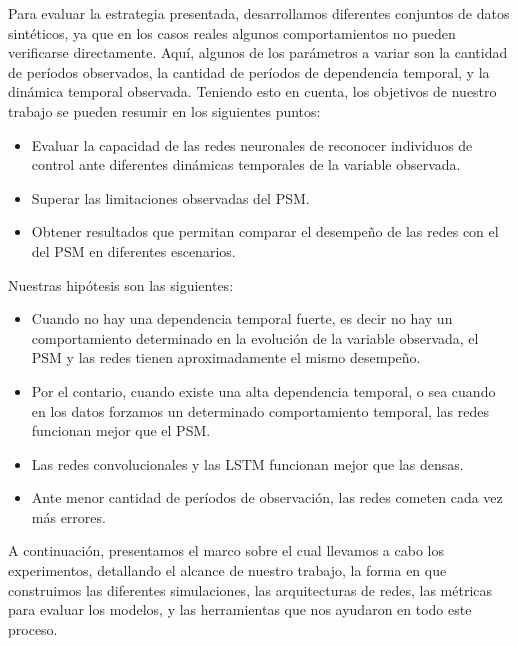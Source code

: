 \documentclass[../main.tex]{subfiles}
\begin{document}
Para evaluar la estrategia presentada, desarrollamos diferentes conjuntos de datos
sintéticos, ya que en los casos reales algunos comportamientos no pueden verificarse
directamente. Aquí, algunos de los parámetros a variar son la cantidad de períodos
observados, la cantidad de períodos de dependencia temporal, y la dinámica temporal
observada. Teniendo esto en cuenta, los objetivos de nuestro trabajo se pueden
resumir en los siguientes puntos:
\begin{itemize}
    \item Evaluar la capacidad de las redes neuronales de reconocer individuos de control
    ante diferentes dinámicas temporales de la variable observada.
    \item Superar las limitaciones observadas del PSM.
    \item Obtener resultados que permitan comparar el desempeño de las redes con
    el del PSM en diferentes escenarios.
\end{itemize}

Nuestras hipótesis son las siguientes:
\begin{itemize}
    \item Cuando no hay una dependencia temporal fuerte, es decir no hay un comportamiento
    determinado en la evolución de la variable observada, el PSM y las redes tienen
    aproximadamente  el mismo desempeño.
    \item Por el contario, cuando existe una alta dependencia temporal, o sea cuando en
    los datos forzamos un determinado comportamiento temporal, las redes funcionan mejor
    que el PSM.
    \item Las redes convolucionales y las LSTM funcionan mejor que las densas.
    \item Ante menor cantidad de períodos de observación, las redes cometen cada
    vez más errores.
\end{itemize}

A continuación, presentamos el marco sobre el cual llevamos a cabo los experimentos,
detallando el alcance de nuestro trabajo, la forma en que construimos las diferentes
simulaciones, las arquitecturas de redes, las métricas para evaluar los modelos,
y las herramientas que nos ayudaron en todo este proceso.
\end{document}
